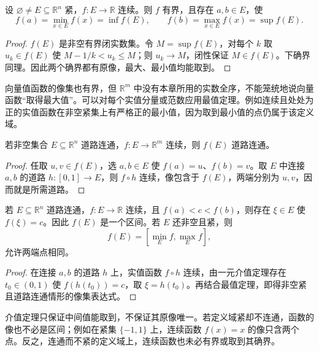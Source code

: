 \begin{corollary}[有界性与最值定理]
\label{cor:multivariable-extreme-value-theorem}
设 $\varnothing\neq E\subseteq\mathbb R^n$ 紧，$f:E\to\mathbb R$ 连续。则 $f$ 有界，且存在 $a,b\in E$，使
\[
    f(a)=\min_{x\in E}f(x)=\inf f(E),\qquad
    f(b)=\max_{x\in E}f(x)=\sup f(E).
\]
\end{corollary}

\begin{proof}
$f(E)$ 是非空有界闭实数集。令 $M=\sup f(E)$，对每个 $k$ 取 $u_k\in f(E)$ 使 $M-1/k<u_k\leq M$；则 $u_k\to M$，闭性保证 $M\in f(E)$。下确界同理。因此两个确界都有原像，最大、最小值均能取到。
\end{proof}

向量值函数的像集也有界，但 $\mathbb R^m$ 中没有本章所用的实数全序，不能笼统地说向量函数“取得最大值”。可以对每个实值分量或范数应用最值定理。例如连续且处处为正的实值函数在非空紧集上有严格正的最小值，因为取到最小值的点仍属于该定义域。

\begin{theorem}[连续像保持道路连通性]
\label{thm:continuous-image-path-connected}
若非空集合 $E\subseteq\mathbb R^n$ 道路连通，$f:E\to\mathbb R^m$ 连续，则 $f(E)$ 道路连通。
\end{theorem}

\begin{proof}
任取 $u,v\in f(E)$，选 $a,b\in E$ 使 $f(a)=u$、$f(b)=v$。取 $E$ 中连接 $a,b$ 的道路 $h:[0,1]\to E$，则 $f\circ h$ 连续，像包含于 $f(E)$，两端分别为 $u,v$，因而就是所需道路。
\end{proof}

\begin{corollary}[多元连续函数的介值定理]
\label{cor:multivariable-intermediate-value-theorem}
若 $E\subseteq\mathbb R^n$ 道路连通，$f:E\to\mathbb R$ 连续，且 $f(a)<c<f(b)$，则存在 $\xi\in E$ 使 $f(\xi)=c$。因此 $f(E)$ 是一个区间。若 $E$ 还非空且紧，则
\[
    f(E)=[\min_E f,\max_E f],
\]
允许两端点相同。
\end{corollary}

\begin{proof}
在连接 $a,b$ 的道路 $h$ 上，实值函数 $f\circ h$ 连续，由一元介值定理存在 $t_0\in(0,1)$ 使 $f(h(t_0))=c$，取 $\xi=h(t_0)$。再结合最值定理，即得非空紧且道路连通情形的像集表达式。
\end{proof}

介值定理只保证中间值能取到，不保证其原像唯一。若定义域紧却不连通，函数的像也不必是区间；例如在紧集 $\{-1,1\}$ 上，连续函数 $f(x)=x$ 的像只含两个点。反之，连通而不紧的定义域上，连续函数也未必有界或取到其确界。

